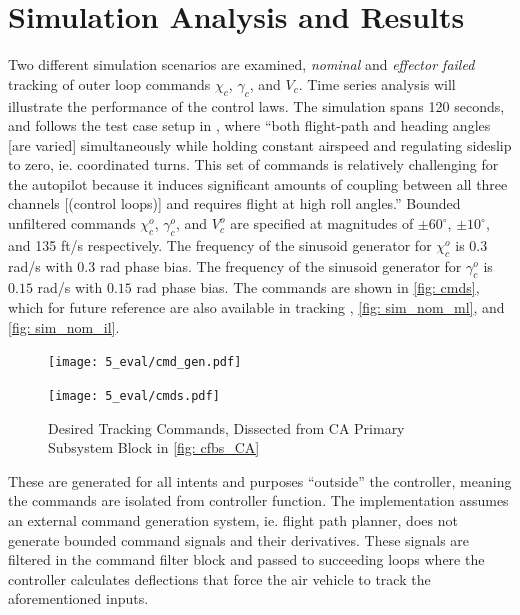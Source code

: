 \documentclass[12pt]{ucthesis}
\begin{document}
\section{Simulation Analysis and Results}
\label{sec: simulation}
%
Two different simulation scenarios are examined, \textit{nominal} and \textit{effector failed} tracking of outer loop commands $\chi_c$, $\gamma_c$, and $V_c$. Time series analysis will illustrate the performance of the control laws. The simulation spans 120 seconds, and follows the test case setup in \citet{Farrell2005}, where ``both flight-path and heading angles [are varied] simultaneously while holding constant airspeed and regulating sideslip to zero, ie. coordinated turns. This set of commands is relatively challenging for the autopilot because it induces significant amounts of coupling between all three channels [(control loops)] and requires flight at high roll angles.'' Bounded unfiltered commands $\chi^o_c$, $\gamma^o_c$, and $V^o_c$ are specified at magnitudes of $\pm 60^{\circ}$, $\pm 10^{\circ}$, and 135 ft/s respectively. The frequency of the sinusoid generator for $\chi^o_c$ is $0.3$ rad/s with $0.3$ rad phase bias. The frequency of the sinusoid generator for $\gamma^o_c$ is $0.15$ rad/s with $0.15$ rad phase bias. The commands are shown in \autoref{fig: cmds}, which for future reference are also available in tracking , \ref{fig: sim_nom_ml}, and \ref{fig: sim_nom_il}.
%
\begin{figure}[H]%
	\begin{minipage}[b]{0.5\linewidth}%
		\begin{flushright}%
			\texttt{[image: 5\_eval/cmd\_gen.pdf]}%
		\end{flushright}%
	\end{minipage}%
	\hspace{0.5cm}%
	\begin{minipage}[b]{0.5\linewidth}%
		\begin{flushleft}%
			\texttt{[image: 5\_eval/cmds.pdf]}%
		\end{flushleft}%
	\end{minipage}%
	\caption{Desired Tracking Commands, Dissected from CA Primary Subsystem Block in \autoref{fig: cfbs_CA}}%
	\label{fig: cmds}%
\end{figure}%
\vspace{-2em}
These are generated for all intents and purposes ``outside'' the controller, meaning the commands are isolated from controller function. The implementation assumes an external command generation system, ie. flight path planner, does not generate bounded command signals and their derivatives. These signals are filtered in the command filter block and passed to succeeding loops where the controller calculates deflections that force the air vehicle to track the aforementioned inputs.
\end{document}

